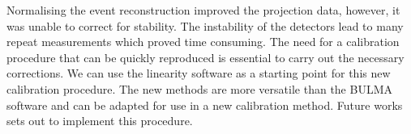 Normalising the event reconstruction improved the projection data, however, it was unable to correct for stability. The instability of the detectors lead to many repeat measurements which proved time consuming. The need for a calibration procedure that can be quickly reproduced is essential to carry out the necessary corrections. We can use the linearity software as a starting point for this new calibration procedure. The new methods are more versatile than the BULMA software and can be adapted for use in a new calibration method. Future works sets out to implement this procedure. 
